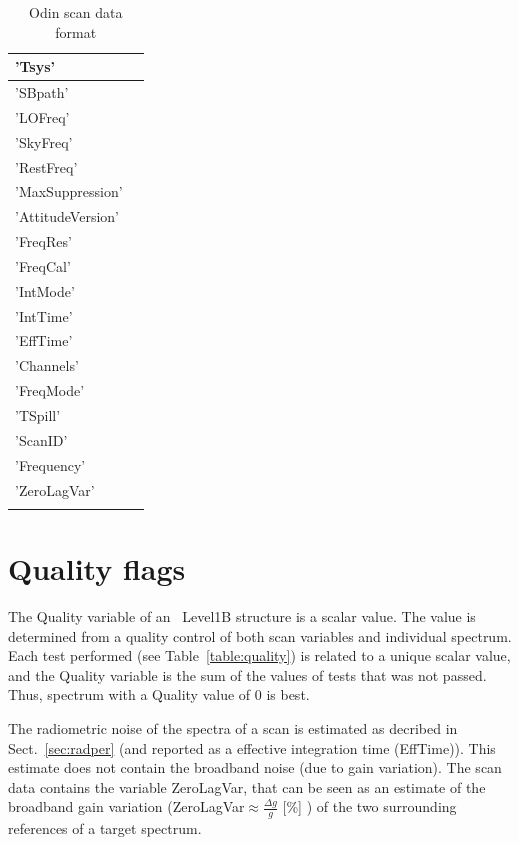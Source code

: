 \begin{longtable}{| p{} | p{} |}
     'Tsys'           & \\ \hline
     'SBpath'          & \\ \hline
     'LOFreq'          & \\ \hline
     'SkyFreq'        & \\ \hline
     'RestFreq'      & \\ \hline
     'MaxSuppression' & \\ \hline
     'AttitudeVersion' & \\  \hline
     'FreqRes'        & \\ \hline
     'FreqCal'         & \\ \hline
     'IntMode'       & \\ \hline
     'IntTime'         & \\ \hline
     'EffTime'         & \\ \hline
     'Channels'       & \\ \hline
     'FreqMode'       & \\ \hline
     'TSpill'         & \\ \hline
     'ScanID'         & \\ \hline
     'Frequency'      & \\ \hline
     'ZeroLagVar'     & \\ \hline
\hline
\caption{ Odin scan data format}
\label{table:dataformat}
\end{longtable}



\section{Quality flags}

The Quality variable of an \smr\ Level1B structure is a scalar value.
The value is determined from a quality control
of both scan variables and individual spectrum.
Each test performed (see Table~\ref{table:quality}) is related to a unique scalar value,
and the Quality variable is the sum of the values of tests 
that was not passed.  
Thus, spectrum with a Quality value of 0 is best.

The radiometric noise of the spectra of a scan is estimated as decribed  
in Sect.~\ref{sec:radper} (and reported as a effective integration time (EffTime)).
This estimate does not contain the broadband noise (due to gain variation). 
The scan data contains the variable ZeroLagVar, that can be seen as an estimate
of the broadband gain variation (ZeroLagVar\(\approx \frac{\Delta g}{g}\) [\%] ) 
of the two surrounding references of a target spectrum. 
 

